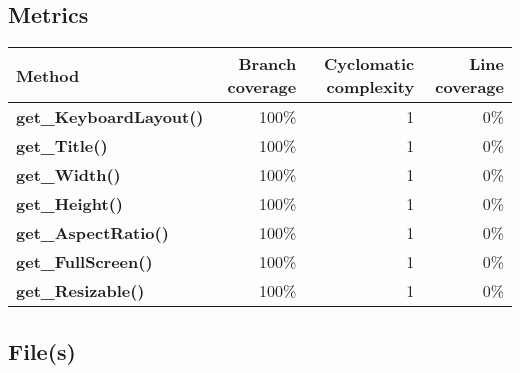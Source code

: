 \documentclass[a4paper,landscape,10pt]{article}
\begin{document}
\subsection{Metrics}
\begin{longtable}[l]{|l|r|r|r|}
\hline
\textbf{Method} & \textbf{Branch coverage} & \textbf{Cyclomatic complexity} & \textbf{Line coverage}\\
\hline
\textbf{get\_KeyboardLayout()} & 100\% & 1 & 0\%\\
\hline
\textbf{get\_Title()} & 100\% & 1 & 0\%\\
\hline
\textbf{get\_Width()} & 100\% & 1 & 0\%\\
\hline
\textbf{get\_Height()} & 100\% & 1 & 0\%\\
\hline
\textbf{get\_AspectRatio()} & 100\% & 1 & 0\%\\
\hline
\textbf{get\_FullScreen()} & 100\% & 1 & 0\%\\
\hline
\textbf{get\_Resizable()} & 100\% & 1 & 0\%\\
\hline
\end{longtable}
\subsection{File(s)}
\end{document}
